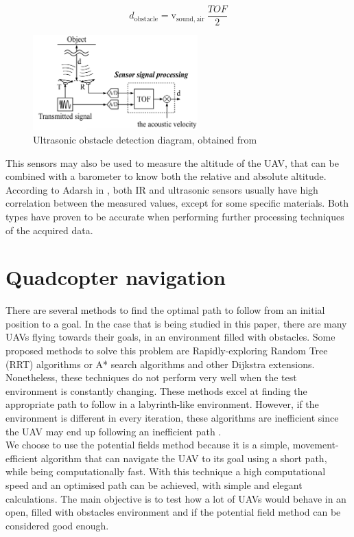 \documentclass[journal]{IEEEtran}
\newcommand*{\subb}[1]{_{\mathrm{#1}}}
\begin{document}
		\begin{equation} \label{eq:ultrasonic_formula}
		d\subb{obstacle} = \textrm{v}\subb{sound, air} \ \frac{TOF}{2}
		\end{equation}
		\begin{figure}[H]
			\centering
			\includegraphics[width=2.5in]{ultrasonic2}
			\caption{Ultrasonic obstacle detection diagram, obtained from \cite{hirata2008cross}}
			\label{fig:ultrasonic}
		\end{figure}
		
		This sensors may also be used to measure the altitude of the UAV, that can be combined with a barometer to know both the relative and absolute altitude. According to Adarsh in \cite{AdarshS2016PcoI}, both IR and ultrasonic sensors usually have high correlation between the measured values, except for some specific materials. Both types have proven to be accurate when performing further processing techniques of the acquired data.
		
	\section{Quadcopter navigation}\label{navigation}
		There are several methods to find the optimal path to follow from an initial position to a goal. In the case that is being studied in this paper, there are many UAVs flying towards their goals, in an environment filled with obstacles. Some proposed methods to solve this problem are Rapidly-exploring Random Tree (RRT) algorithms or A* search algorithms and other Dijkstra extensions.	Nonetheless, these techniques do not perform very well when the test environment is constantly changing. These methods excel at finding the appropriate path to follow in a labyrinth-like environment. However, if the environment is different in every iteration, these algorithms are inefficient since the UAV may end up following an inefficient path \cite{lavalle_rrt, lavalle_astar}.\\
 	
		We choose to use the potential fields method because it is a simple, movement-efficient algorithm that can navigate the UAV to its goal using a short path, while being computationally fast. With this technique a high computational speed and an optimised path can be achieved, with simple and elegant calculations\cite{Ge2002}. The main objective is to test how a lot of UAVs would behave in an open, filled with obstacles environment and if the potential field method can be considered good enough.\\
	
\end{document}
